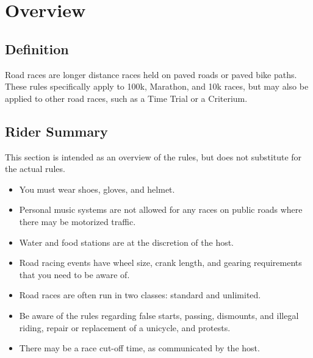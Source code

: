 \chapter{Overview \label{chap:road_racing}}

\section{Definition}

Road races are longer distance races held on paved roads or paved bike paths.
These rules specifically apply to 100k, Marathon, and 10k races, but may also be applied to other road races, such as a Time Trial or a Criterium.

\section{Rider Summary}

This section is intended as an overview of the rules, but does not substitute for the actual rules.
\begin{itemize}
\item You must wear shoes, gloves, and helmet.
\item Personal music systems are not allowed for any races on public roads where there may be motorized traffic.
\item Water and food stations are at the discretion of the host.
\item Road racing events have wheel size, crank length, and gearing
requirements that you need to be aware of.
\item Road races are often run in two classes: standard and unlimited.
\item Be aware of the rules regarding false starts, passing, dismounts, and illegal riding, repair or replacement of a unicycle, and protests.
\item There may be a race cut-off time, as communicated by the host.
\end{itemize}
